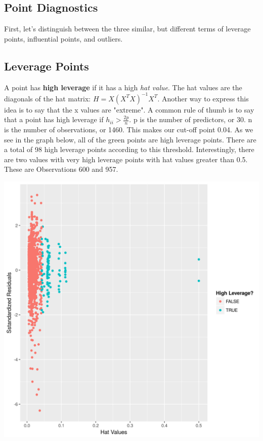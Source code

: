\documentclass[12pt]{article}
\begin{document}
\begin{flushleft}
\begin{flushleft}
\section{Point Diagnostics}
\begin{flushleft}
First, let's distinguish between the three similar, but different terms of leverage points, influential points, and outliers.
\end{flushleft}
\subsection{Leverage Points}
\begin{flushleft}

A point has \textbf{high leverage} if it has a high \textit{hat value}. The hat values are the diagonals of the hat matrix: $H = X(X^{T}X)^{-1}X^{T}$. Another way to express this idea is to say that the x values are "extreme". A common rule of thumb is to say that a point has high leverage if
$h_{ii} > \frac{2p}{n}$. p is the number of predictors, or 30. n is the number of observations, or 1460. This makes our cut-off point 0.04. As we see in the graph below, all of the green points are high leverage points. There are a total of 98 high leverage points according to this threshold. Interestingly, there are two values with very high leverage points with hat values greater than 0.5. These are Observations 600 and 957.
\end{flushleft}
\centering
    \vspace*{0.5 cm}
    \includegraphics[scale = .40]{leverage.png}\\[1.0 cm]	
    

\end{flushleft}
\end{flushleft}
\end{document}
